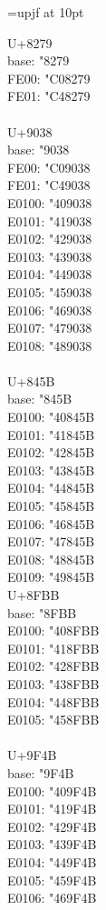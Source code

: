 \documentclass{ujarticle}
\begin{document}
\pagestyle{empty}
\parindent0pt
\begin{multicols*}{4}

\newcommand{\VS}{\\}
\font\upjf=upjf at 10pt
\upjf

U+8279\\
base: \kchar"8279\\
FE00: \kchar"C08279\\
FE01: \kchar"C48279\\
\VS
U+9038\\
base: \kchar"9038\\
FE00: \kchar"C09038\\
FE01: \kchar"C49038\\
E0100: \kchar"409038\\
E0101: \kchar"419038\\
E0102: \kchar"429038\\
E0103: \kchar"439038\\
E0104: \kchar"449038\\
E0105: \kchar"459038\\
E0106: \kchar"469038\\
E0107: \kchar"479038\\
E0108: \kchar"489038\\
\VS
U+845B\\
base: \kchar"845B\\
E0100: \kchar"40845B\\
E0101: \kchar"41845B\\
E0102: \kchar"42845B\\
E0103: \kchar"43845B\\
E0104: \kchar"44845B\\
E0105: \kchar"45845B\\
E0106: \kchar"46845B\\
E0107: \kchar"47845B\\
E0108: \kchar"48845B\\
E0109: \kchar"49845B\\

\newcolumn
U+8FBB\\
base: \kchar"8FBB\\
E0100: \kchar"408FBB\\
E0101: \kchar"418FBB\\
E0102: \kchar"428FBB\\
E0103: \kchar"438FBB\\
E0104: \kchar"448FBB\\
E0105: \kchar"458FBB\\
\VS
U+9F4B\\
base: \kchar"9F4B\\
E0100: \kchar"409F4B\\
E0101: \kchar"419F4B\\
E0102: \kchar"429F4B\\
E0103: \kchar"439F4B\\
E0104: \kchar"449F4B\\
E0105: \kchar"459F4B\\
E0106: \kchar"469F4B


\end{multicols*}
\end{document}
